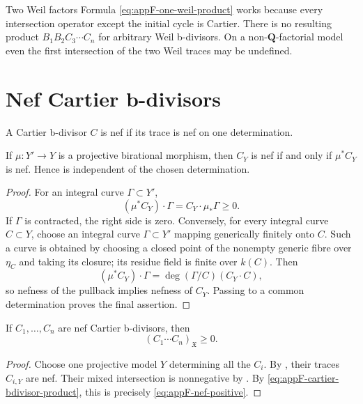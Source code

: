 \begin{warning}{Two Weil factors}
\label{warn:appF-two-weil-factors}
Formula \eqref{eq:appF-one-weil-product} works because every intersection
operator except the initial cycle is Cartier.
There is no resulting product
\(B_1B_2C_3\cdots C_n\) for arbitrary Weil b-divisors.
On a non-\(\mathbf Q\)-factorial model even the first intersection of the
two Weil traces may be undefined.
\end{warning}

\section{Nef Cartier b-divisors}
\label{sec:appF-nef-cartier}

\begin{definition}
\label{def:appF-nef-cartier}
A Cartier b-divisor \(C\) is nef if its trace is nef on one determination.
\end{definition}

\begin{lemma}\label{lem:appF-nef-determination}
If \(\mu:Y'\to Y\) is a projective birational morphism, then
\(C_Y\) is nef if and only if \(\mu^*C_Y\) is nef.
Hence  is independent of the chosen
determination.
\end{lemma}

\begin{proof}
For an integral curve \(\Gamma\subset Y'\),
\[
 (\mu^*C_Y)\cdot\Gamma=C_Y\cdot\mu_*\Gamma\geq0.
\]
If \(\Gamma\) is contracted, the right side is zero.
Conversely, for every integral curve \(C\subset Y\), choose an integral
curve \(\Gamma\subset Y'\) mapping generically finitely onto \(C\).
Such a curve is obtained by choosing a closed point of the nonempty
generic fibre over \(\eta_C\) and taking its closure; its residue field
is finite over \(k(C)\).
Then
\[
 (\mu^*C_Y)\cdot\Gamma
 =\deg(\Gamma/C)(C_Y\cdot C),
\]
so nefness of the pullback implies nefness of \(C_Y\).  Passing to a
common determination proves the final assertion.
\end{proof}

\begin{corollary}\label{cor:appF-nef-positive}
If \(C_1,\ldots,C_n\) are nef Cartier b-divisors, then
\[
                          (C_1\cdots C_n)_{\mathfrak X}\geq0.
\tag{F.12}\label{eq:appF-nef-positive}
\]
\end{corollary}
\begin{proof}
Choose one projective model \(Y\) determining all the \(C_i\).  By
, their traces \(C_{i,Y}\) are nef.
Their mixed intersection is nonnegative by
.  By
\eqref{eq:appF-cartier-bdivisor-product}, this is precisely
\eqref{eq:appF-nef-positive}.
\end{proof}

